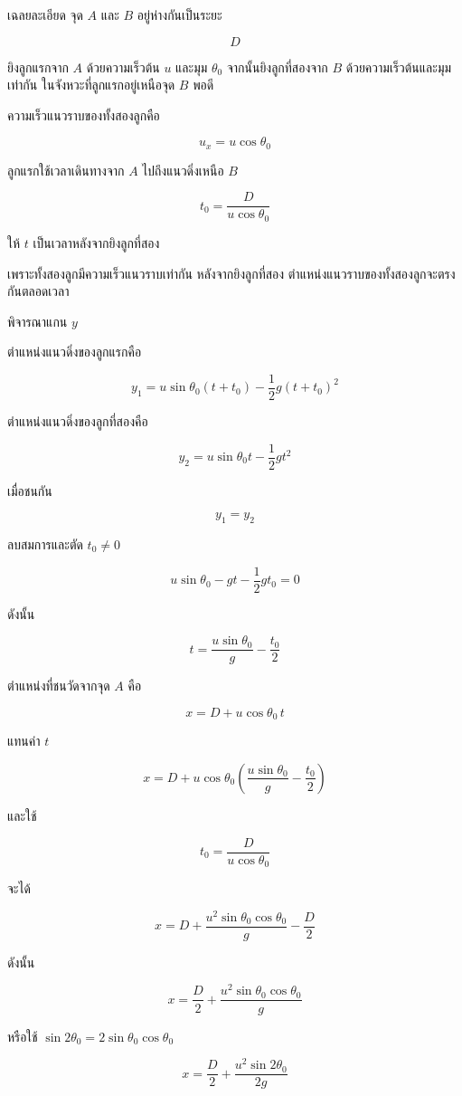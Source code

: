 \begin{examplebox}{เฉลยละเอียด}
จุด $A$ และ $B$ อยู่ห่างกันเป็นระยะ

\[
D
\]

ยิงลูกแรกจาก $A$ ด้วยความเร็วต้น $u$ และมุม $\theta_0$ จากนั้นยิงลูกที่สองจาก $B$ ด้วยความเร็วต้นและมุมเท่ากัน ในจังหวะที่ลูกแรกอยู่เหนือจุด $B$ พอดี

ความเร็วแนวราบของทั้งสองลูกคือ

\[
u_x=u\cos\theta_0
\]

ลูกแรกใช้เวลาเดินทางจาก $A$ ไปถึงแนวดิ่งเหนือ $B$

\[
t_0=\frac{D}{u\cos\theta_0}
\]

ให้ $t$ เป็นเวลาหลังจากยิงลูกที่สอง

เพราะทั้งสองลูกมีความเร็วแนวราบเท่ากัน หลังจากยิงลูกที่สอง ตำแหน่งแนวราบของทั้งสองลูกจะตรงกันตลอดเวลา

พิจารณาแกน $y$

ตำแหน่งแนวดิ่งของลูกแรกคือ

\[
y_1=u\sin\theta_0(t+t_0)-\frac{1}{2}g(t+t_0)^2
\]

ตำแหน่งแนวดิ่งของลูกที่สองคือ

\[
y_2=u\sin\theta_0t-\frac{1}{2}gt^2
\]

เมื่อชนกัน

\[
y_1=y_2
\]

ลบสมการและตัด $t_0\neq 0$

\[
u\sin\theta_0-g t-\frac{1}{2}g t_0=0
\]

ดังนั้น

\[
t=\frac{u\sin\theta_0}{g}-\frac{t_0}{2}
\]

ตำแหน่งที่ชนวัดจากจุด $A$ คือ

\[
x=D+u\cos\theta_0\,t
\]

แทนค่า $t$

\[
x=D+u\cos\theta_0
\left(
\frac{u\sin\theta_0}{g}-\frac{t_0}{2}
\right)
\]

และใช้

\[
t_0=\frac{D}{u\cos\theta_0}
\]

จะได้

\[
x=D+\frac{u^2\sin\theta_0\cos\theta_0}{g}-\frac{D}{2}
\]

ดังนั้น

\[
\boxed{
x=\frac{D}{2}+\frac{u^2\sin\theta_0\cos\theta_0}{g}
}
\]

หรือใช้ $\sin2\theta_0=2\sin\theta_0\cos\theta_0$

\[
\boxed{
x=\frac{D}{2}+\frac{u^2\sin2\theta_0}{2g}
}
\]
\end{examplebox}

